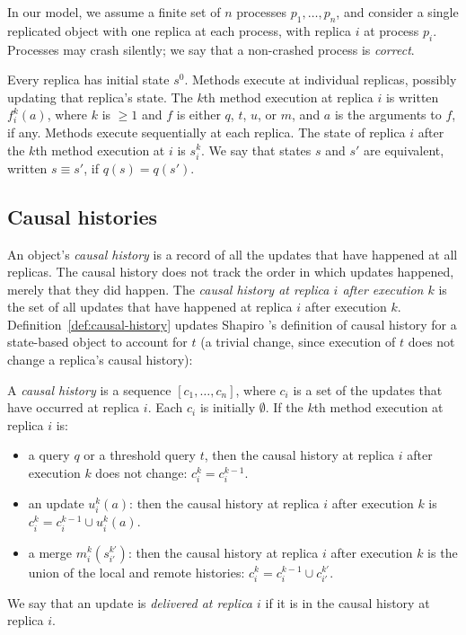 In our model, we assume a finite set of $n$ processes $p_1, \dots, p_n$, and
consider a single replicated object with one replica at each process,
with replica $i$ at process $p_i$.  Processes may crash silently; we
say that a non-crashed process is \emph{correct}.

Every replica has initial state $s^0$.  Methods execute at individual
replicas, possibly updating that replica's state.  The $k$th method
execution at replica $i$ is written $f^{k}_{i}(a)$, where $k$ is $\geq 1$ and $f$ is
either $q$, $t$, $u$, or $m$, and $a$ is the arguments to $f$, if any.
Methods execute sequentially at each replica.
The state of replica $i$ after the $k$th method execution at $i$ is
$s^{k}_{i}$.  We say that states $s$ and $s'$ are equivalent, written
$s \equiv s'$, if $q(s) = q(s')$.

\subsection{Causal histories}

An object's \emph{causal history} is a record of all the updates that
 have happened at all replicas.  The causal history does
not track the order in which updates happened, merely that
they did happen.  The \emph{causal history at replica $i$ after
  execution $k$} is the set of all updates that have
happened at replica $i$ after execution $k$.
Definition~\ref{def:causal-history} updates Shapiro
\etal's definition of causal history for a state-based object
to account for $t$ (a trivial change, since execution of $t$
does not change a replica's causal history):
\begin{definition}
  \label{def:causal-history}
  A \emph{causal history} is a sequence $[c_1, \dots, c_n]$, where
  $c_i$ is a set of the updates that have occurred at
  replica $i$.  Each $c_i$ is initially $\emptyset$.  If the $k$th
  method execution at replica $i$ is:
  \begin{itemize}
    \item a query $q$ or a threshold query $t$, then the causal
      history at replica $i$ after execution $k$ does not change:
      $c^{k}_{i} = c^{k-1}_{i}$.
    \item an update $u^{k}_{i}(a)$: then the causal history at replica
      $i$ after execution $k$ is $c^{k}_{i} = c^{k-1}_{i} \cup {
      u^{k}_{i}(a) }$.
    \item a merge $m^{k}_{i}(s^{k'}_{i'})$: then the causal history at
      replica $i$ after execution $k$ is the union of the local and
      remote histories: $c^{k}_{i} = c^{k-1}_{i} \cup c^{k'}_{i'}$.
  \end{itemize}
\end{definition}
We say that an update is \emph{delivered at replica $i$} if it is in
the causal history at replica $i$.

